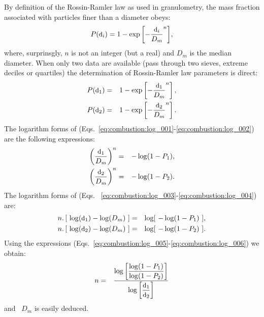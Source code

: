 By definition of the Rossin-Ramler law as used in granulometry, the mass
fraction associated with particles finer than a diameter obeys:
\begin{equation*}
  P(\mbox{\small d}_i) = 1-\exp{\left[-\dfrac{\mbox{\small d}_i}{D_m} ^n \right]},
\end{equation*} 
where, surprinsgly, $n$ is not an integer (but a real) and $D_m$ is the median
diameter. When only two data are available (pass through two sieves, extreme
deciles or quartiles) the determination of Rossin-Ramler law parameters is
direct:
\begin{eqnarray}
  \displaystyle P(\mbox{\small d}_1) &=& 1-\exp\left[-\frac{\mbox{\small d}_1}{D_m}^n\right], \label{eq:combustion:log_001} \\
  \displaystyle P(\mbox{\small d}_2) &=& 1-\exp\left[-\frac{\mbox{\small d}_2}{D_m}^n\right]. \label{eq:combustion:log_002}
\end{eqnarray}
The logarithm forms of (Eqs.~\ref{eq:combustion:log_001}-\ref{eq:combustion:log_002}) are the
following expressions:
\begin{eqnarray}
  \displaystyle \left(\frac{\mbox{\small d}_1}{D_m} \right)^n &=& - \log(1-P_1), \label{eq:combustion:log_003} \\
  \displaystyle \left(\frac{\mbox{\small d}_2}{D_m} \right)^n &=& - \log(1-P_2). \label{eq:combustion:log_004} 
\end{eqnarray}
The logarithm forms of (Eqs. ~\ref{eq:combustion:log_003}-\ref{eq:combustion:log_004})
are:
\begin{eqnarray}
  \displaystyle n . \left[~ \log(\mbox{\small d}_1)-\log(D_m)~\right] &=& \log[~-\log(1-P_1)~], \label{eq:combustion:log_005} \\
  \displaystyle n . \left[~ \log(\mbox{\small d}_2)-\log(D_m)~\right] &=& \log[~-\log(1-P_2)~]. \label{eq:combustion:log_006}
\end{eqnarray}
Using the expressions (Eqs.~\ref{eq:combustion:log_005}-\ref{eq:combustion:log_006}) we obtain:
\begin{eqnarray}
n &=& \frac{\log \left[\displaystyle\frac{ \log(1-P_1)}{\log(1-P_2)}\right]}{\displaystyle\log\left[\frac{\mbox{\small d}_1}{\mbox{\small d}_2} \right]} 
\end{eqnarray}
and~ $D_m$ is easily deduced.

